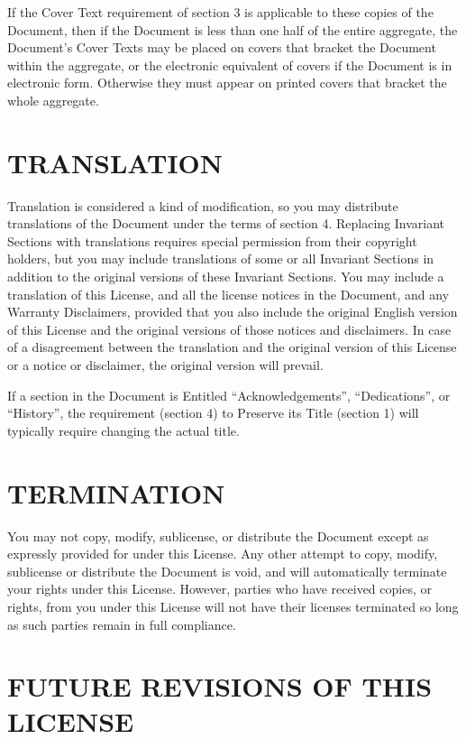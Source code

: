 If the Cover Text requirement of section 3 is applicable to these copies
of the Document, then if the Document is less than one half of the
entire aggregate, the Document's Cover Texts may be placed on covers
that bracket the Document within the aggregate, or the electronic
equivalent of covers if the Document is in electronic form. Otherwise
they must appear on printed covers that bracket the whole aggregate.

\section{TRANSLATION}\label{translation}

Translation is considered a kind of modification, so you may distribute
translations of the Document under the terms of section 4. Replacing
Invariant Sections with translations requires special permission from
their copyright holders, but you may include translations of some or all
Invariant Sections in addition to the original versions of these
Invariant Sections. You may include a translation of this License, and
all the license notices in the Document, and any Warranty Disclaimers,
provided that you also include the original English version of this
License and the original versions of those notices and disclaimers. In
case of a disagreement between the translation and the original version
of this License or a notice or disclaimer, the original version will
prevail.

If a section in the Document is Entitled ``Acknowledgements'',
``Dedications'', or ``History'', the requirement (section 4) to Preserve
its Title (section 1) will typically require changing the actual title.

\section{TERMINATION}\label{termination}

You may not copy, modify, sublicense, or distribute the Document except
as expressly provided for under this License. Any other attempt to copy,
modify, sublicense or distribute the Document is void, and will
automatically terminate your rights under this License. However, parties
who have received copies, or rights, from you under this License will
not have their licenses terminated so long as such parties remain in
full compliance.

\section{FUTURE REVISIONS OF THIS
LICENSE}\label{future-revisions-of-this-license}

